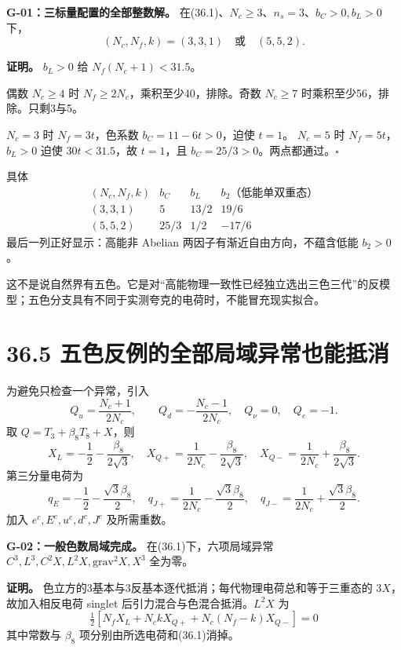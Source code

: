 \documentclass[
  11pt,
  oneside]{book}
\begin{document}
\protect\hypertarget{g-01}{}{}

\textbf{G-01：三标量配置的全部整数解。}
在(36.1)、\(N_c\ge3\)、\(n_s=3\)、\(b_C>0,b_L>0\) 下， \[
(N_c,N_f,k)=(3,3,1)\quad\text{或}\quad(5,5,2).
\tag{36.6}
\]

\textbf{证明。} \(b_L>0\) 给 \(N_f(N_c+1)<31.5\)。

偶数 \(N_c\ge4\) 时 \(N_f\ge2N_c\)，乘积至少40，排除。奇数 \(N_c\ge7\)
时乘积至少56，排除。只剩3与5。

\(N_c=3\) 时 \(N_f=3t\)，色系数 \(b_C=11-6t>0\)，迫使 \(t=1\)。
\(N_c=5\) 时 \(N_f=5t\)，\(b_L>0\) 迫使 \(30t<31.5\)，故 \(t=1\)，且
\(b_C=25/3>0\)。两点都通过。\(\square\)

具体 \[
\begin{array}{c|ccc}
(N_c,N_f,k)&b_C&b_L&b_2\text{（低能单双重态）}\\\hline
(3,3,1)&5&13/2&19/6\\
(5,5,2)&25/3&1/2&-17/6
\end{array}
\tag{36.7}
\] 最后一列正好显示：高能非 Abelian 两因子有渐近自由方向，不蕴含低能
\(b_2>0\)。

这不是说自然界有五色。它是对``高能物理一致性已经独立选出三色三代''的反模型；五色分支具有不同于实测夸克的电荷时，不能冒充现实拟合。

\hypertarget{ux4e94ux8272ux53cdux4f8bux7684ux5168ux90e8ux5c40ux57dfux5f02ux5e38ux4e5fux80fdux62b5ux6d88}{%
\section{36.5
五色反例的全部局域异常也能抵消}\label{ux4e94ux8272ux53cdux4f8bux7684ux5168ux90e8ux5c40ux57dfux5f02ux5e38ux4e5fux80fdux62b5ux6d88}}

为避免只检查一个异常，引入 \[
Q_u=\frac{N_c+1}{2N_c},\qquad
Q_d=-\frac{N_c-1}{2N_c},\quad Q_\nu=0,\quad Q_e=-1.
\] 取 \(Q=T_3+\beta_8T_8+X\)，则 \[
X_L=-\frac12-\frac{\beta_8}{2\sqrt3},\quad
X_{Q+}=\frac1{2N_c}-\frac{\beta_8}{2\sqrt3},\quad
X_{Q-}=\frac1{2N_c}+\frac{\beta_8}{2\sqrt3}.
\] 第三分量电荷为 \[
q_E=-\frac12-\frac{\sqrt3\beta_8}{2},\quad
q_{J+}=\frac1{2N_c}-\frac{\sqrt3\beta_8}{2},\quad
q_{J-}=\frac1{2N_c}+\frac{\sqrt3\beta_8}{2}.
\] 加入 \(e^c,E^c,u^c,d^c,J^c\) 及所需重数。

\protect\hypertarget{g-02}{}{}

\textbf{G-02：一般色数局域完成。} 在(36.1)下，六项局域异常
\(C^3,L^3,C^2X,L^2X,\mathrm{grav}^2X,X^3\) 全为零。

\textbf{证明。}
色立方的3基本与3反基本逐代抵消；每代物理电荷总和等于三重态的
\(3X\)，故加入相反电荷 singlet 后引力混合与色混合抵消。\(L^2X\) 为 \[
\tfrac12[N_fX_L+N_c kX_{Q+}+N_c(N_f-k)X_{Q-}]=0
\] 其中常数与 \(\beta_8\) 项分别由所选电荷和(36.1)消掉。
\end{document}
